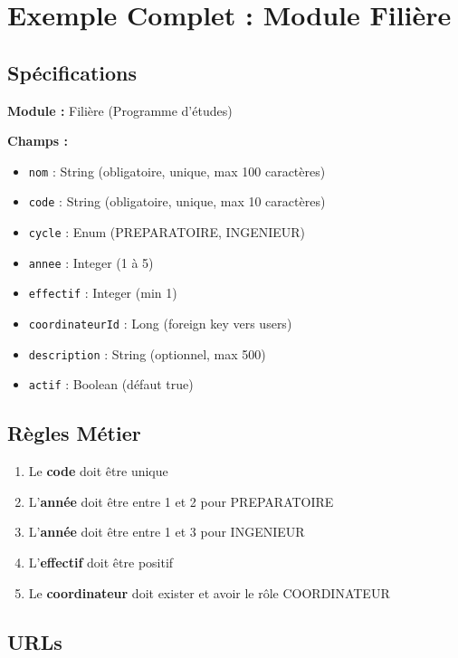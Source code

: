 \documentclass[12pt,a4paper]{article}
\begin{document}
\newpage

\section{Exemple Complet : Module Filière}

\subsection{Spécifications}

\textbf{Module :} Filière (Programme d'études)

\textbf{Champs :}
\begin{itemize}
    \item \texttt{nom} : String (obligatoire, unique, max 100 caractères)
    \item \texttt{code} : String (obligatoire, unique, max 10 caractères)
    \item \texttt{cycle} : Enum (PREPARATOIRE, INGENIEUR)
    \item \texttt{annee} : Integer (1 à 5)
    \item \texttt{effectif} : Integer (min 1)
    \item \texttt{coordinateurId} : Long (foreign key vers users)
    \item \texttt{description} : String (optionnel, max 500)
    \item \texttt{actif} : Boolean (défaut true)
\end{itemize}

\subsection{Règles Métier}

\begin{enumerate}
    \item Le \textbf{code} doit être unique
    \item L'\textbf{année} doit être entre 1 et 2 pour PREPARATOIRE
    \item L'\textbf{année} doit être entre 1 et 3 pour INGENIEUR
    \item L'\textbf{effectif} doit être positif
    \item Le \textbf{coordinateur} doit exister et avoir le rôle COORDINATEUR
\end{enumerate}

\subsection{URLs}
\end{document}
